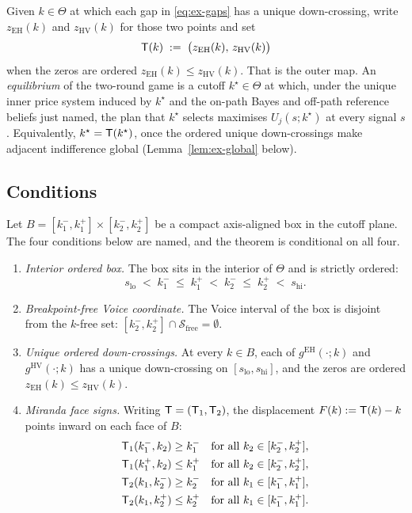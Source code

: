 Given $k\in\Theta$ at which each gap in \eqref{eq:ex-gaps} has a unique down-crossing, write
$z_{\mathrm{EH}}(k)$ and $z_{\mathrm{HV}}(k)$ for those two points and set
\begin{equation}
\label{eq:ex-T}
\mathsf{T}(k) \;:=\; \bigl(z_{\mathrm{EH}}(k),\, z_{\mathrm{HV}}(k)\bigr)
\end{equation}
when the zeros are ordered $z_{\mathrm{EH}}(k)\le z_{\mathrm{HV}}(k)$. That is the outer map. An
\emph{equilibrium} of the two-round game is a cutoff $k^\star\in\Theta$ at which, under the unique
inner price system induced by $k^\star$ and the on-path Bayes and off-path reference beliefs just
named, the plan that $k^\star$ selects maximises $U_j(s;k^\star)$ at every signal $s$. Equivalently,
$k^\star=\mathsf{T}(k^\star)$, once the ordered unique down-crossings make adjacent indifference global
(Lemma~\ref{lem:ex-global} below).

\subsection*{Conditions}
\label{sec:pf-existence-conditions}

Let $B=[k_1^-,k_1^+]\times[k_2^-,k_2^+]$ be a compact axis-aligned box in the cutoff plane. The four
conditions below are named, and the theorem is conditional on all four.

\begin{enumerate}[label=(B\arabic*),leftmargin=2.6em,itemsep=4pt]
\item \label{cond:B1} \emph{Interior ordered box.} The box sits in the interior of $\Theta$ and is
  strictly ordered:
  \[
  s_{\mathrm{lo}} \;<\; k_1^- \;\le\; k_1^+ \;<\; k_2^- \;\le\; k_2^+ \;<\; s_{\mathrm{hi}}.
  \]
\item \label{cond:B2} \emph{Breakpoint-free Voice coordinate.} The Voice interval of the box is
  disjoint from the $k$-free set: $[k_2^-,k_2^+]\cap\mathcal S_{\mathrm{free}}=\emptyset$.
\item \label{cond:B3} \emph{Unique ordered down-crossings.} At every $k\in B$, each of
  $g^{\mathrm{EH}}(\cdot;k)$ and $g^{\mathrm{HV}}(\cdot;k)$ has a unique down-crossing on
  $[s_{\mathrm{lo}},s_{\mathrm{hi}}]$, and the zeros are ordered
  $z_{\mathrm{EH}}(k)\le z_{\mathrm{HV}}(k)$.
\item \label{cond:B4} \emph{Miranda face signs.} Writing $\mathsf{T}=(\mathsf{T}_1,\mathsf{T}_2)$, the displacement
  $F(k):=\mathsf{T}(k)-k$ points inward on each face of $B$:
  \begin{align}
  \label{eq:ex-miranda}
  \mathsf{T}_1(k_1^-,k_2) &\ge k_1^-
    &&\text{for all }k_2\in[k_2^-,k_2^+],
  \nonumber\\
  \mathsf{T}_1(k_1^+,k_2) &\le k_1^+
    &&\text{for all }k_2\in[k_2^-,k_2^+],
  \\
  \mathsf{T}_2(k_1,k_2^-) &\ge k_2^-
    &&\text{for all }k_1\in[k_1^-,k_1^+],
  \nonumber\\
  \mathsf{T}_2(k_1,k_2^+) &\le k_2^+
    &&\text{for all }k_1\in[k_1^-,k_1^+].
  \nonumber
  \end{align}
\end{enumerate}

